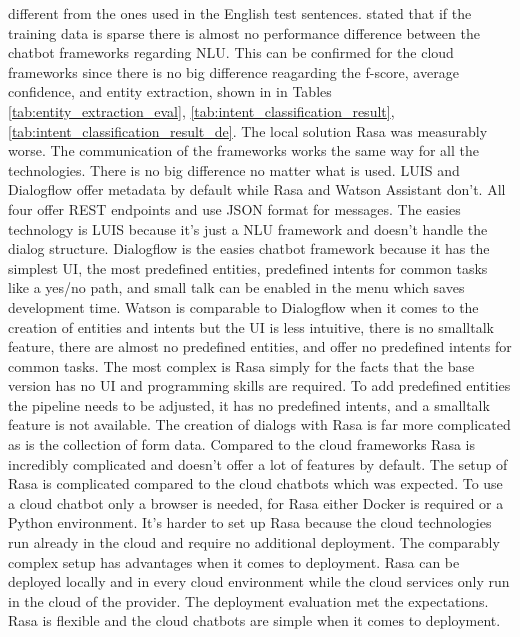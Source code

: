 different from the ones used in the English test sentences.
\citet{braunEvaluatingNLU} stated that if the training data is sparse there is almost no 
performance difference between the chatbot frameworks regarding NLU.
This can be confirmed for the cloud frameworks since there is no big difference reagarding the f-score, 
average confidence, and entity extraction, shown in in Tables \ref{tab:entity_extraction_eval}, \ref{tab:intent_classification_result}, \ref{tab:intent_classification_result_de}.
The local solution Rasa was measurably worse.
The communication of the frameworks works the same way for all the technologies.
There is no big difference no matter what is used.
LUIS and Dialogflow offer metadata by default while Rasa and Watson Assistant don't.
All four offer REST endpoints and use JSON format for messages.
The easies technology is LUIS because it's just a NLU framework and doesn't handle the dialog structure.
Dialogflow is the easies chatbot framework because it has the simplest UI, the most predefined entities,
predefined intents for common tasks like a yes/no path, and small talk can be enabled in the menu which 
saves development time.
Watson is comparable to Dialogflow when it comes to the creation of entities and intents but the 
UI is less intuitive, there is no smalltalk feature, there are almost no predefined entities, 
and offer no predefined intents for common tasks.
The most complex is Rasa simply for the facts that the base version has no UI and programming 
skills are required.
To add predefined entities the pipeline needs to be adjusted, it has no predefined intents, 
and a smalltalk feature is not available.
The creation of dialogs with Rasa is far more complicated as is the collection of form data.
Compared to the cloud frameworks Rasa is incredibly complicated and doesn't offer a lot of 
features by default.
The setup of Rasa is complicated compared to the cloud chatbots which was expected.
To use a cloud chatbot only a browser is needed, for Rasa either Docker is required or a Python
environment.
It's harder to set up Rasa because the cloud technologies run already in the cloud and require 
no additional deployment.
The comparably complex setup has advantages when it comes to deployment.
Rasa can be deployed locally and in every cloud environment while the cloud services only 
run in the cloud of the provider.
The deployment evaluation met the expectations.
Rasa is flexible and the cloud chatbots are simple when it comes to deployment.
